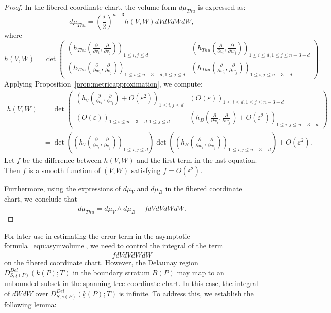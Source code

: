 \documentclass{compositio}
\numberwithin{equation}{section}
\numberwithin{figure}{section}
\theoremstyle{definition}
\theoremstyle{plain}
\begin{document}
{\begin{proof}
In the fibered coordinate chart, the volume form $d\mu_{Thu}$ is expressed as:
$$
d\mu_{Thu} = \left(\frac{i}{2}\right)^{n-3} h(V,W) dV d\overline{V} dW d\overline{W},
$$
where 
$$
 h(V,W) = \operatorname{det}\left(
    \begin{array}{ll}
       \left(h_{Thu}\left(\frac{\partial}{\partial v_i},\frac{\partial}{\partial v_j}\right)\right)_{1\leq i,j\leq d}  & \left(h_{Thu}\left(\frac{\partial}{\partial v_i},\frac{\partial}{\partial w_j}\right)\right)_{1\leq i \leq d,1\leq j\leq n-3-d}  \\
       \left(h_{Thu}\left(\frac{\partial}{\partial w_i},\frac{\partial}{\partial v_j}\right)\right)_{1\leq i \leq n-3-d,1\leq j\leq d}  & \left(h_{Thu}\left(\frac{\partial}{\partial w_i},\frac{\partial}{\partial w_j}\right)\right)_{1\leq i,j\leq n-3-d}
    \end{array}
    \right).
$$
Applying Proposition~\ref{prop:metricapproximation}, we compute:
\begin{align*}
    h(V,W) 
    &= \operatorname{det}\left(
    \begin{array}{ll}
       \left(h_V\left(\frac{\partial}{\partial v_i},\frac{\partial}{\partial v_j}\right) + O(\varepsilon^2)\right)_{1\leq i,j\leq d}  & \left(O(\varepsilon)\right)_{1\leq i \leq d,1\leq j\leq n-3-d}  \\
       \left(O(\varepsilon)\right)_{1\leq i \leq n-3-d,1\leq j\leq d}  & \left(h_{B}\left(\frac{\partial}{\partial w_i},\frac{\partial}{\partial w_j}\right) + O(\varepsilon^2)\right)_{1\leq i,j\leq n-3-d}
    \end{array}
    \right)\\
    &= \operatorname{det}\left(\left(h_V\left(\frac{\partial}{\partial v_i},\frac{\partial}{\partial v_j}\right)\right)_{1\leq i,j\leq d}\right) 
    \operatorname{det}\left(\left(h_B\left(\frac{\partial}{\partial w_i},\frac{\partial}{\partial w_j}\right)\right)_{1\leq i,j\leq n-3-d}\right) +O(\varepsilon^2).
\end{align*}
Let $f$ be the difference between $h(V,W)$ and the first term in the last equation. Then $f$ is a smooth function of $(V,W)$ satisfying $f = O(\varepsilon^2)$. 

Furthermore, using the expressions of $d\mu_V$ and $d\mu_B$ in the fibered coordinate chart, we conclude that
$$
d\mu_{Thu} = d\mu_V\wedge d\mu_B + f dV d\overline{V} dW d\overline{W}.
$$
\end{proof}

For later use in estimating the error term in the asymptotic formula~\eqref{equ:asymvolume}, we need to control the integral of the term
$$
fdV d\overline{V} dW d\overline{W}
$$
on the fibered coordinate chart. However, the Delaunay region $D_{S,\underline{s}(P)}^{Del}(\underline{k}(P);T)$ in the boundary stratum $B(P)$ may map to an unbounded subset in the spanning tree coordinate chart. In this case, the integral of $dW d\overline{W}$ over $D_{S,\underline{s}(P)}^{Del}(\underline{k}(P);T)$ is infinite. To address this, we establish the following lemma:

}
\end{document}
